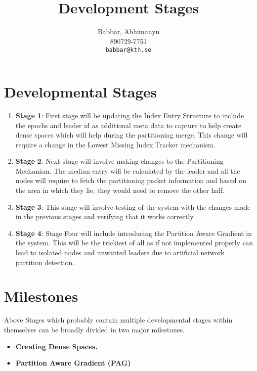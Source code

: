 \documentclass[a4paper, 11pt]{article}
\author{
  Babbar, Abhimanyu\\
  \textsc{890729-7751}\\
  \texttt{babbar@kth.se}
}
\title{Development Stages}
\begin{document}
\maketitle 



\section*{Developmental Stages}

\begin{enumerate}

\item \textbf{Stage 1}: First stage will be updating the Index Entry Structure to include the epochs and leader id as additional meta data to capture to help create dense spaces which will help during the partitioning merge. This change will require a change in the Lowest Missing Index Tracker mechanism.

\item \textbf{Stage 2}: Next stage will involve making changes to the  Partitioning Mechanism. The median entry will be calculated by the leader and all the nodes will require to fetch the partitioning packet information and based on the area in which they lie, they would need to remove the other half. 

\item \textbf{Stage 3}: This  stage will involve testing of the system with the changes made in the previous stages and verifying that it works correctly.

\item \textbf{Stage 4}: Stage Four will include introducing the Partition Aware Gradient in the system. This will be the trickiest of all as if not implemented properly can lead to isolated nodes and unwanted leaders due to artificial network partition detection.

\end{enumerate}



\section*{Milestones}

Above Stages which probably contain multiple developmental stages within themselves can be broadly divided in two major milestones.

\begin{itemize}

\item \textbf{Creating Dense Spaces.}

\item \textbf{Partition Aware Gradient (PAG)}

\end{itemize}
\end{document}
